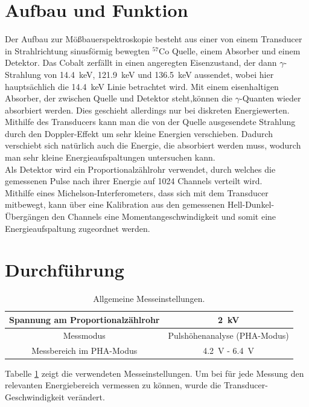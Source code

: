 \documentclass[12pt,a4paper]{article}
\begin{document}
\section{Aufbau und Funktion}
Der Aufbau zur Mößbauerspektroskopie besteht aus einer von einem Transducer in Strahlrichtung sinusförmig bewegten $^{57}$Co Quelle, einem Absorber und einem Detektor. Das Cobalt zerfällt in einen angeregten Eisenzustand, der dann $\gamma$-Strahlung von \SI{14,4}{keV}, \SI{121.9}{keV} und \SI{136.5}{keV} aussendet, wobei hier hauptsächlich die \SI{14,4}{keV} Linie betrachtet wird. Mit einem eisenhaltigen Absorber, der zwischen Quelle und Detektor steht,können die $\gamma$-Quanten wieder absorbiert werden. Dies geschieht allerdings nur bei diskreten Energiewerten. Mithilfe des Transducers kann man die von der Quelle ausgesendete Strahlung durch den Doppler-Effekt um sehr kleine Energien verschieben. Dadurch verschiebt sich natürlich auch die Energie, die absorbiert werden muss, wodurch man sehr kleine Energieaufspaltungen untersuchen kann.\\
Als Detektor wird ein Proportionalzählrohr verwendet, durch welches die gemessenen Pulse nach ihrer Energie auf 1024 Channels verteilt wird.\\
Mithilfe eines Michelson-Interferometers, dass sich mit dem Transducer mitbewegt, kann über eine Kalibration aus den gemessenen Hell-Dunkel-Übergängen den Channels eine Momentangeschwindigkeit und somit eine Energieaufspaltung zugeordnet werden.

\section{Durchführung}

\begin{table}
\centering
\begin{tabular}{|c|c|}
\hline 
Spannung am Proportionalzählrohr & \SI{2}{kV} \\ 
\hline 
Messmodus & Pulshöhenanalyse (PHA-Modus) \\
\hline 
Messbereich im PHA-Modus & \SI{4,2}{V} - \SI{6,4}{V} \\
\hline 
\end{tabular} 
\caption{Allgemeine Messeinstellungen.}
\label{tab:Mess_Einstellungen}
\end{table}

Tabelle \ref{tab:Mess_Einstellungen} zeigt die verwendeten Messeinstellungen. Um bei für jede Messung den relevanten Energiebereich vermessen zu können, wurde die Transducer-Geschwindigkeit verändert.
\end{document}
